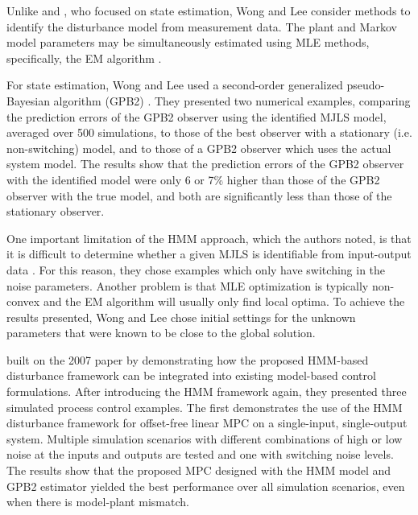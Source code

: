 Unlike \cite{robertson_detection_1995} and \cite{eriksson_classification_1996}, who focused on state estimation, Wong and Lee consider methods to identify the disturbance model from measurement data. The plant and Markov model parameters may be simultaneously estimated using \gls{MLE} methods, specifically, the \gls{EM} algorithm \citep{dempster_maximum_1977}.

For state estimation, Wong and Lee used a second-order generalized pseudo-Bayesian algorithm (\acrshort{GPB2}) \citep{bar-shalom_estimation_1993}. They presented two numerical examples, comparing the prediction errors of the \gls{GPB2} observer using the identified \gls{MJLS} model, averaged over 500 simulations, to those of the best observer with a stationary (i.e. non-switching) model, and to those of a \gls{GPB2} observer which uses the actual system model.  The results show that the prediction errors of the \gls{GPB2} observer with the identified model were only 6 or 7\% higher than those of the \gls{GPB2} observer with the true model, and both are significantly less than those of the stationary observer.

One important limitation of the \gls{HMM} approach, which the authors noted, is that it is difficult to determine whether a given \gls{MJLS} is identifiable from input-output data \citep{vidal_observability_2002}. For this reason, they chose examples which only have switching in the noise parameters. Another problem is that \gls{MLE} optimization is typically non-convex and the \gls{EM} algorithm will usually only find local optima. To achieve the results presented, Wong and Lee chose initial settings for the unknown parameters that were known to be close to the global solution.

\cite{wong_realistic_2009} built on the 2007 paper by demonstrating how the proposed \gls{HMM}-based disturbance framework can be integrated into existing model-based control formulations. After introducing the \gls{HMM} framework again, they presented three simulated process control examples. The first demonstrates the use of the \gls{HMM} disturbance framework for offset-free linear \gls{MPC} on a single-input, single-output system. Multiple simulation scenarios with different combinations of high or low noise at the inputs and outputs are tested and one with switching noise levels. The results show that the proposed \gls{MPC} designed with the \gls{HMM} model and \gls{GPB2} estimator yielded the best performance over all simulation scenarios, even when there is model-plant mismatch.

